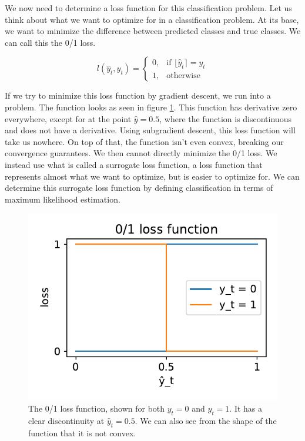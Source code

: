We now need to determine a loss function for this classification problem. Let
us think about what we want to optimize for in a classification problem. At its
base, we want to minimize the difference between predicted classes and true
classes. We can call this the 0/1 loss.

\begin{equation}
  l(\hat y_t, y_t) = \begin{cases}
    0, & \text{if } \lfloor \hat y_t \rceil = y_t \\
    1, & \text{otherwise} 
  \end{cases}
\end{equation}

If we try to minimize this loss function by gradient descent, we run into a
problem. The function looks as seen in figure \ref{fig:0_1_loss}. This function
has derivative zero everywhere, except for at the point $\hat y=0.5$, where the
function is discontinuous and does not have a derivative. Using subgradient
descent, this loss function will take us nowhere. On top of that, the function
isn't even convex, breaking our convergence guarantees. We then cannot directly
minimize the 0/1 loss. We instead use what is called a surrogate loss function,
a loss function that represents almost what we want to optimize, but is easier
to optimize for. We can determine this surrogate loss function by defining
classification in terms of maximum likelihood estimation.

\begin{figure}
  \centering
  \includegraphics{Pictures/0_1_loss_function.pdf}
  \caption{The 0/1 loss function, shown for both $y_t=0$ and $y_t=1$. It has a
  clear discontinuity at $\hat y_t=0.5$. We can also see from the shape of the
  function that it is not convex.}
  \label{fig:0_1_loss}
\end{figure}


